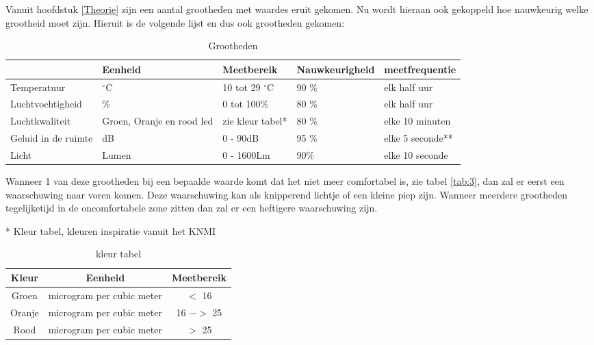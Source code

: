 Vanuit hoofdstuk \ref{Theorie} zijn een aantal grootheden met waardes eruit gekomen. Nu wordt hieraan ook gekoppeld
hoe nauwkeurig welke grootheid moet zijn. Hieruit is de volgende lijst en dus ook grootheden gekomen:

\begin{table}[ht]
    \begin{tabular}{p{3.3cm}||p{3cm}|p{3cm}|p{3cm}|p{3cm}}
         & Eenheid & Meetbereik & Nauwkeurigheid & meetfrequentie\\
         \hline
        Temperatuur &  $^{\circ}$C  & 10 tot 29 $^{\circ}$C & 90 \% & elk half uur\\
        Luchtvochtigheid & \% & 0 tot 100\%& 80 \% & elk half uur\\
        Luchtkwaliteit & Groen, Oranje en rood led & zie kleur tabel*& 80 \% & elke 10 minuten\\
        Geluid in de ruimte & dB & 0 - 90dB & 95 \% & elke 5 seconde**\\
        Licht & Lumen & 0 - 1600Lm & 90\% & elke 10 seconde
    \end{tabular}
    \caption{Grootheden}
    \label{tab:1}
\end{table}

 \vspace{0.4cm}
Wanneer 1 van deze grootheden bij een bepaalde waarde komt dat het niet meer comfortabel is, zie tabel \ref{tab:3}, 
dan zal er eerst een waarschuwing naar voren komen. Deze waarschuwing kan als knipperend lichtje of een kleine piep zijn. 
Wanneer meerdere grootheden tegelijketijd in de oncomfortabele zone zitten dan zal er een heftigere waarschuwing zijn. 

\vspace{1.5cm}
* Kleur tabel, kleuren inspiratie vanuit het KNMI \cite{Gezonde} \\

\begin{table}[ht]
    \begin{tabular}{c|c|c}
       Kleur & Eenheid & Meetbereik \\
       \hline
       Groen  &  microgram per cubic meter & $ < $ 16\\
       Oranje  &  microgram per cubic meter & 16 $->$ 25\\
       Rood & microgram per cubic meter & $>$ 25
    \end{tabular}
    \caption{kleur tabel}
    \label{tab:2}
\end{table}

\vspace{0.2cm}

